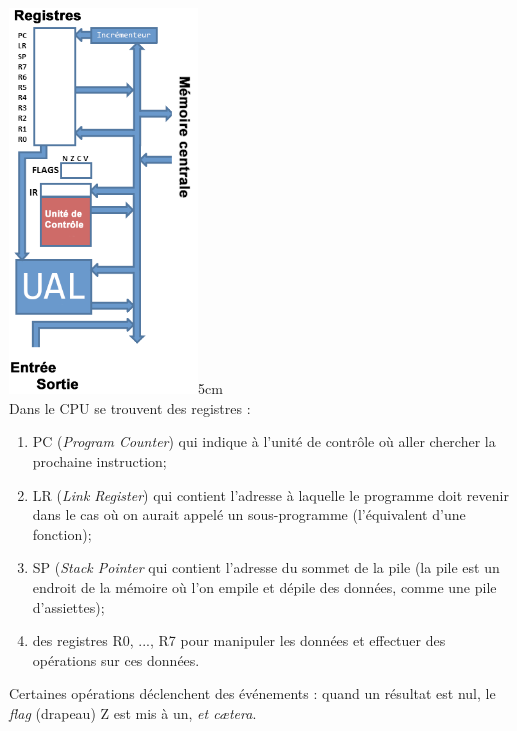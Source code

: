\documentclass[a4paper,12pt,french]{book}
\begin{document}
{\includegraphics[width=5cm]{vn2.png}}{5cm}\\


Dans le CPU se trouvent des registres :
\begin{enumerate}[\textbullet]
	\item 	PC (\textit{Program Counter}) qui indique à l'unité de contrôle où aller chercher la prochaine instruction;
	\item 	LR	(\textit{Link Register}) qui contient l'adresse à laquelle le programme doit revenir dans le cas où on aurait appelé un sous-programme (l'équivalent d'une fonction);
	\item 	SP (\textit{Stack Pointer} qui contient l'adresse du sommet de la pile (la pile est un endroit de la mémoire où l'on \og empile\fg{} et \og dépile\fg{} des données, comme une pile d'assiettes);
	\item 	des registres R0, ..., R7 pour manipuler les données et effectuer des opérations sur ces données.
\end{enumerate}
Certaines opérations déclenchent des \og événements\fg{} : quand un résultat est nul, le \textit{flag} (drapeau) Z est mis à un, \textit{et c\ae tera}.
\end{document}
